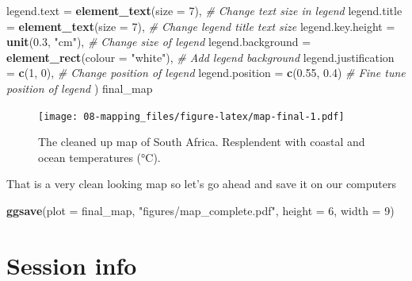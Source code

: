 \documentclass[
]{book}
\newenvironment{Shaded}{\begin{snugshade}}{\end{snugshade}}
\newcommand{\CommentTok}[1]{\textcolor[rgb]{0.56,0.35,0.01}{\textit{#1}}}
\newcommand{\DataTypeTok}[1]{\textcolor[rgb]{0.13,0.29,0.53}{#1}}
\newcommand{\DecValTok}[1]{\textcolor[rgb]{0.00,0.00,0.81}{#1}}
\newcommand{\FloatTok}[1]{\textcolor[rgb]{0.00,0.00,0.81}{#1}}
\newcommand{\KeywordTok}[1]{\textcolor[rgb]{0.13,0.29,0.53}{\textbf{#1}}}
\newcommand{\NormalTok}[1]{#1}
\newcommand{\OperatorTok}[1]{\textcolor[rgb]{0.81,0.36,0.00}{\textbf{#1}}}
\newcommand{\StringTok}[1]{\textcolor[rgb]{0.31,0.60,0.02}{#1}}
\begin{document}
\begin{Shaded}
\begin{Highlighting}[]
        \DataTypeTok{legend.text =} \KeywordTok{element\_text}\NormalTok{(}\DataTypeTok{size =} \DecValTok{7}\NormalTok{), }\CommentTok{\# Change text size in legend}
        \DataTypeTok{legend.title =} \KeywordTok{element\_text}\NormalTok{(}\DataTypeTok{size =} \DecValTok{7}\NormalTok{), }\CommentTok{\# Change legend title text size}
        \DataTypeTok{legend.key.height =} \KeywordTok{unit}\NormalTok{(}\FloatTok{0.3}\NormalTok{, }\StringTok{"cm"}\NormalTok{), }\CommentTok{\# Change size of legend}
        \DataTypeTok{legend.background =} \KeywordTok{element\_rect}\NormalTok{(}\DataTypeTok{colour =} \StringTok{"white"}\NormalTok{), }\CommentTok{\# Add legend background}
        \DataTypeTok{legend.justification =} \KeywordTok{c}\NormalTok{(}\DecValTok{1}\NormalTok{, }\DecValTok{0}\NormalTok{), }\CommentTok{\# Change position of legend}
        \DataTypeTok{legend.position =} \KeywordTok{c}\NormalTok{(}\FloatTok{0.55}\NormalTok{, }\FloatTok{0.4}\NormalTok{) }\CommentTok{\# Fine tune position of legend}
\NormalTok{        )}
\NormalTok{final\_map}
\end{Highlighting}
\end{Shaded}

\begin{figure}
\centering
\texttt{[image: 08-mapping\_files/figure-latex/map-final-1.pdf]}
\caption{\label{fig:map-final}The cleaned up map of South Africa. Resplendent with coastal and ocean temperatures (°C).}
\end{figure}

That is a very clean looking map so let's go ahead and save it on our computers

\begin{Shaded}
\begin{Highlighting}[]
\KeywordTok{ggsave}\NormalTok{(}\DataTypeTok{plot =}\NormalTok{ final\_map, }\StringTok{"figures/map\_complete.pdf"}\NormalTok{, }\DataTypeTok{height =} \DecValTok{6}\NormalTok{, }\DataTypeTok{width =} \DecValTok{9}\NormalTok{)}
\end{Highlighting}
\end{Shaded}

\hypertarget{session-info-6}{%
\section{Session info}\label{session-info-6}}

\begin{Shaded}
\end{Shaded}
\end{document}

